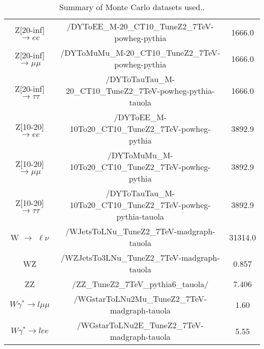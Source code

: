 \begin{table}[!ht]
\begin{center}
{\begin{tabular}{|c|c|c|}
Z[20-inf] $\rightarrow ee$	  	 &   /DYToEE\_M-20\_CT10\_TuneZ2\_7TeV-powheg-pythia                   &  1666.0 \\
Z[20-inf] $\rightarrow \mu\mu$        	 &   /DYToMuMu\_M-20\_CT10\_TuneZ2\_7TeV-powheg-pythia                 &  1666.0 \\	       
Z[20-inf] $\rightarrow \tau\tau$  	 &   /DYToTauTau\_M-20\_CT10\_TuneZ2\_7TeV-powheg-pythia-tauola        &  1666.0 \\
Z[10-20]  $\rightarrow ee$	  	 &   /DYToEE\_M-10To20\_CT10\_TuneZ2\_7TeV-powheg-pythia               &  3892.9 \\
Z[10-20]  $\rightarrow \mu\mu$    	 &   /DYToMuMu\_M-10To20\_CT10\_TuneZ2\_7TeV-powheg-pythia             &  3892.9 \\
Z[10-20]  $\rightarrow \tau\tau$  	 &   /DYToTauTau\_M-10To20\_CT10\_TuneZ2\_7TeV-powheg-pythia-tauola    &  3892.9 \\
W $\rightarrow$ $\ell\nu$           	 &   /WJetsToLNu\_TuneZ2\_7TeV-madgraph-tauola                         &  31314.0 \\
WZ                               	 &   /WZJetsTo3LNu\_TuneZ2\_7TeV-madgraph-tauola                       &  0.857 \\
ZZ                               	 &   /ZZ\_TuneZ2\_7TeV\_pythia6\_tauola/                               &  7.406 \\
$W\gamma^{*}\rightarrow l\mu\mu$         &   /WGstarToLNu2Mu\_TuneZ2\_7TeV-madgraph-tauola                     &  1.60 \\ 
$W\gamma^{*}\rightarrow lee$             &   /WGstarToLNu2E\_TuneZ2\_7TeV-madgraph-tauola                      &  5.55 \\ 
\hline
\hline
\end{tabular}
}
\caption{Summary of Monte Carlo datasets used.\label{tab:DatasetsMC}.}
\end{center}
\end{table}

